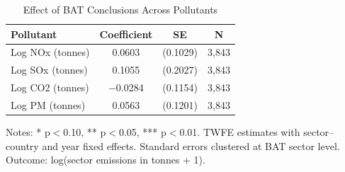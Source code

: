 \begin{table}[H]
\centering
\caption{Effect of BAT Conclusions Across Pollutants}
\begin{threeparttable}
\begin{tabular}{lccc}
\toprule
Pollutant & Coefficient & SE & N \\
\midrule
Log NOx (tonnes) & 0.0603 & (0.1029) & 3,843 \\
Log SOx (tonnes) & 0.1055 & (0.2027) & 3,843 \\
Log CO2 (tonnes) & $-$0.0284 & (0.1154) & 3,843 \\
Log PM (tonnes) & 0.0563 & (0.1201) & 3,843 \\
\bottomrule
\end{tabular}
\begin{tablenotes}[flushleft]
\small
\item Notes: * p$<$0.10, ** p$<$0.05, *** p$<$0.01. TWFE estimates with sector--country and year fixed effects. Standard errors clustered at BAT sector level. Outcome: log(sector emissions in tonnes + 1).
\end{tablenotes}
\end{threeparttable}
\label{tab:multi_outcomes}
\end{table}

